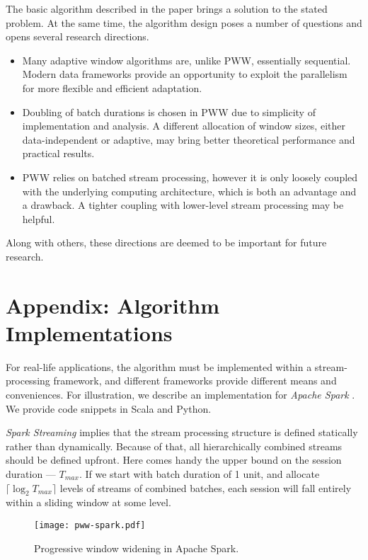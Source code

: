 \documentclass[runningheads,a4paper]{llncs}
\begin{document}
The basic algorithm described in the paper brings a solution to
the stated problem. At the same time, the algorithm design poses
a number of questions and opens several research directions. 
\begin{itemize}
    \item Many adaptive window algorithms are, unlike PWW, essentially
        sequential. Modern data frameworks provide an opportunity to
        exploit the parallelism for more flexible and efficient
        adaptation.
    \item Doubling of batch durations is chosen in PWW due to
        simplicity of implementation and analysis. A different
        allocation of window sizes, either data-independent or
        adaptive, may bring better theoretical performance and
        practical results.
    \item PWW relies on batched stream processing,
        however it is only loosely coupled with the underlying 
        computing architecture, which is both an advantage and a
        drawback. A tighter coupling with lower-level
        stream processing may be helpful.
\end{itemize}
Along with others, these directions are deemed to be important
for future research.




\clearpage
\section*{Appendix: Algorithm Implementations}

For real-life applications, the algorithm must be implemented
within a stream-processing framework, and different frameworks
provide different means and conveniences. For illustration, we
describe an implementation for {\it Apache Spark} \cite{ZCF+10}. We
provide code snippets in Scala and Python.

{\it Spark Streaming} implies that the stream processing
structure is defined statically rather than dynamically. Because
of that, all hierarchically combined streams should be defined
upfront.  Here comes handy the upper bound on the session
duration --- $T_{max}$. If we start with batch duration of 1
unit, and allocate $\lceil \log_2 T_{max} \rceil$ levels of
streams of combined batches, each session will fall entirely
within a sliding window at some level.

\begin{figure}
    \centering
	\texttt{[image: pww-spark.pdf]}
	\caption{Progressive window widening in Apache Spark.}
    \label{fig:pww-spark}
\end{figure}
\end{document}
